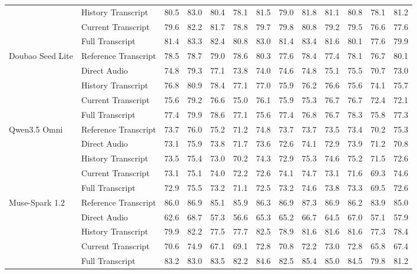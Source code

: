 \begin{table}[htbp]
\begin{tabular*}{\linewidth}{@{}ll@{\extracolsep{\fill}}*{11}{r}@{}}
 & History Transcript & 80.5 & 83.0 & 80.4 & 78.1 & 81.5 & 79.0 & 81.8 & 81.1 & 80.8 & 78.1 & 81.2 \\
 & Current Transcript & 79.6 & 82.2 & 81.7 & 78.8 & 79.7 & 79.8 & 80.8 & 79.2 & 79.5 & 76.6 & 77.6 \\
 & Full Transcript & 81.4 & 83.3 & 82.4 & 80.8 & 83.0 & 81.4 & 83.4 & 81.6 & 80.1 & 77.6 & 79.9 \\
\addlinespace[1pt]
\midrule
Doubao Seed Lite & Reference Transcript & 78.5 & 78.7 & 79.0 & 78.6 & 80.3 & 77.6 & 78.4 & 77.4 & 78.1 & 76.7 & 80.1 \\
 & Direct Audio & 74.8 & 79.3 & 77.1 & 73.8 & 74.0 & 74.6 & 74.8 & 75.1 & 75.5 & 70.7 & 73.0 \\
 & History Transcript & 76.8 & 80.9 & 78.4 & 77.1 & 77.0 & 75.9 & 76.2 & 76.6 & 75.6 & 74.1 & 75.7 \\
 & Current Transcript & 75.6 & 79.2 & 76.6 & 75.0 & 76.1 & 75.9 & 75.3 & 76.7 & 76.7 & 72.4 & 72.1 \\
 & Full Transcript & 77.4 & 79.9 & 78.6 & 77.1 & 75.6 & 77.4 & 76.8 & 76.7 & 78.3 & 75.8 & 77.3 \\
\addlinespace[1pt]
\midrule
Qwen3.5 Omni & Reference Transcript & 73.7 & 76.0 & 75.2 & 71.2 & 74.8 & 73.7 & 73.7 & 73.5 & 73.4 & 70.2 & 75.3 \\
 & Direct Audio & 73.1 & 75.9 & 73.8 & 71.7 & 73.6 & 72.6 & 74.1 & 72.9 & 73.9 & 71.2 & 70.8 \\
 & History Transcript & 73.5 & 75.4 & 73.0 & 70.2 & 74.3 & 72.9 & 75.3 & 74.6 & 75.2 & 71.5 & 72.6 \\
 & Current Transcript & 73.1 & 75.1 & 74.0 & 72.2 & 72.6 & 74.1 & 74.7 & 73.1 & 71.6 & 69.3 & 74.6 \\
 & Full Transcript & 72.9 & 75.5 & 73.2 & 71.1 & 72.5 & 73.2 & 74.6 & 73.8 & 73.3 & 69.5 & 72.6 \\
\addlinespace[1pt]
\midrule
Muse-Spark 1.2 & Reference Transcript & 86.0 & 86.9 & 85.1 & 85.9 & 86.3 & 86.9 & 87.3 & 86.9 & 86.2 & 83.9 & 85.0 \\
 & Direct Audio & 62.6 & 68.7 & 57.3 & 56.6 & 65.3 & 65.2 & 66.7 & 64.5 & 67.0 & 57.1 & 57.9 \\
 & History Transcript & 79.9 & 82.2 & 77.5 & 77.7 & 82.5 & 78.9 & 81.6 & 81.6 & 81.6 & 77.3 & 78.4 \\
 & Current Transcript & 70.6 & 74.9 & 67.1 & 69.1 & 72.8 & 70.8 & 72.2 & 73.0 & 72.8 & 65.8 & 67.4 \\
 & Full Transcript & 83.2 & 83.0 & 83.5 & 82.2 & 84.6 & 82.5 & 85.4 & 85.0 & 84.5 & 79.8 & 81.2 \\
\bottomrule
\end{tabular*}
\endgroup
\end{table}
